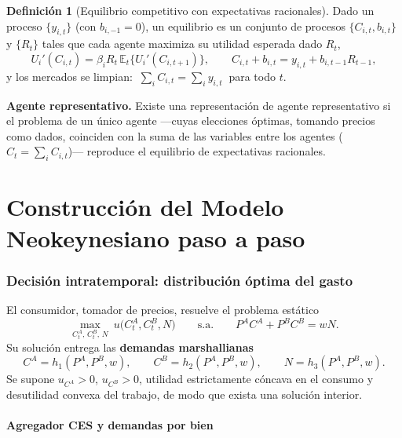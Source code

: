 \documentclass[11pt]{article}
\newenvironment{notabox}[1][Nota]%
  {\par\medskip\noindent\textbf{#1.}\enspace\ignorespaces}%
  {\par\medskip}
\theoremstyle{definition}
\newtheorem{definicion}{Definición}[section]
\newcommand{\E}{\mathbb{E}}
\begin{document}
\begin{definicion}[Equilibrio competitivo con expectativas racionales]
Dado un proceso $\{y_{i,t}\}$ (con $b_{i,-1}=0$), un equilibrio es un conjunto de procesos
$\{C_{i,t},b_{i,t}\}$ y $\{R_{t}\}$ tales que cada agente maximiza su utilidad esperada dado $R_{t}$,
\[
U_{i}'(C_{i,t})=\beta_{i}R_{t}\,\E_{t}\{U_{i}'(C_{i,t+1})\},
\qquad
C_{i,t}+b_{i,t}=y_{i,t}+b_{i,t-1}R_{t-1},
\]
y los mercados se limpian: $\ \sum_{i}C_{i,t}=\sum_{i}y_{i,t}\ $ para todo $t$.
\end{definicion}

\begin{notabox}[Agente representativo]
Existe una representación de agente representativo si el problema de un único agente ---cuyas
elecciones óptimas, tomando precios como dados, coinciden con la suma de las variables entre los
agentes ($C_{t}=\sum_{i}C_{i,t}$)--- reproduce el equilibrio de expectativas racionales.
\end{notabox}

\part{Construcción del Modelo Neokeynesiano paso a paso}

\section{Decisión intratemporal: distribución óptima del gasto}

El consumidor, tomador de precios, resuelve el problema estático
\begin{equation}
\max_{C^{A}_{t},\,C^{B}_{t},\,N}\ u\big(C^{A}_{t},C^{B}_{t},N\big)
\qquad\text{s.a.}\qquad
P^{A}C^{A}+P^{B}C^{B}=wN .
\end{equation}
Su solución entrega las \textbf{demandas marshallianas}
\begin{equation}
C^{A}=h_{1}(P^{A},P^{B},w),\qquad
C^{B}=h_{2}(P^{A},P^{B},w),\qquad
N=h_{3}(P^{A},P^{B},w).
\end{equation}
Se supone $u_{C^{A}}>0$, $u_{C^{B}}>0$, utilidad estrictamente cóncava en el consumo y desutilidad
convexa del trabajo, de modo que exista una solución interior.

\subsection{Agregador CES y demandas por bien}
\end{document}
